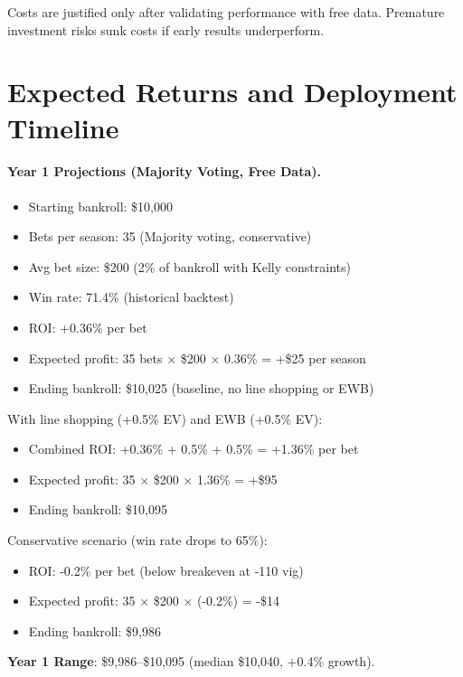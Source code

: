 Costs are justified only after validating performance with free data. Premature investment risks sunk costs if early results underperform.

\section{Expected Returns and Deployment Timeline}
\label{sec:expected_returns}

\paragraph{Year 1 Projections (Majority Voting, Free Data).}
\begin{itemize}
\item Starting bankroll: \$10,000
\item Bets per season: 35 (Majority voting, conservative)
\item Avg bet size: \$200 (2\% of bankroll with Kelly constraints)
\item Win rate: 71.4\% (historical backtest)
\item ROI: +0.36\% per bet
\item Expected profit: 35 bets × \$200 × 0.36\% = +\$25 per season
\item Ending bankroll: \$10,025 (baseline, no line shopping or EWB)
\end{itemize}

With line shopping (+0.5\% EV) and EWB (+0.5\% EV):
\begin{itemize}
\item Combined ROI: +0.36\% + 0.5\% + 0.5\% = +1.36\% per bet
\item Expected profit: 35 × \$200 × 1.36\% = +\$95
\item Ending bankroll: \$10,095
\end{itemize}

Conservative scenario (win rate drops to 65\%):
\begin{itemize}
\item ROI: -0.2\% per bet (below breakeven at -110 vig)
\item Expected profit: 35 × \$200 × (-0.2\%) = -\$14
\item Ending bankroll: \$9,986
\end{itemize}

\textbf{Year 1 Range}: \$9,986--\$10,095 (median \$10,040, +0.4\% growth).

